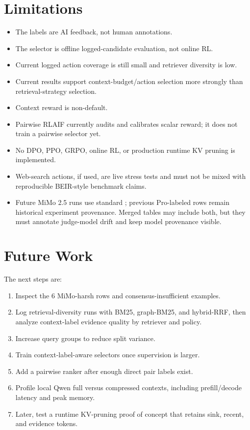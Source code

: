 \section{Limitations}

\begin{itemize}[leftmargin=*]
  \item The labels are AI feedback, not human annotations.
  \item The selector is offline logged-candidate evaluation, not online RL.
  \item Current logged action coverage is still small and retriever diversity is low.
  \item Current results support context-budget/action selection more strongly than retrieval-strategy selection.
  \item Context reward is non-default.
  \item Pairwise RLAIF currently audits and calibrates scalar reward; it does not train a pairwise selector yet.
  \item No DPO, PPO, GRPO, online RL, or production runtime KV pruning is implemented.
  \item Web-search actions, if used, are live stress tests and must not be mixed with reproducible BEIR-style benchmark claims.
  \item Future MiMo 2.5 runs use standard ; previous Pro-labeled rows remain historical experiment provenance. Merged tables may include both, but they must annotate judge-model drift and keep model provenance visible.
\end{itemize}

\section{Future Work}

The next steps are:

\begin{enumerate}[leftmargin=*]
  \item Inspect the 6 MiMo-harsh rows and consensus-insufficient examples.
  \item Log retrieval-diversity runs with BM25, graph-BM25, and hybrid-RRF, then analyze context-label evidence quality by retriever and policy.
  \item Increase query groups to reduce split variance.
  \item Train context-label-aware selectors once supervision is larger.
  \item Add a pairwise ranker after enough direct pair labels exist.
  \item Profile local Qwen full versus compressed contexts, including prefill/decode latency and peak memory.
  \item Later, test a runtime KV-pruning proof of concept that retains sink, recent, and evidence tokens.
\end{enumerate}
